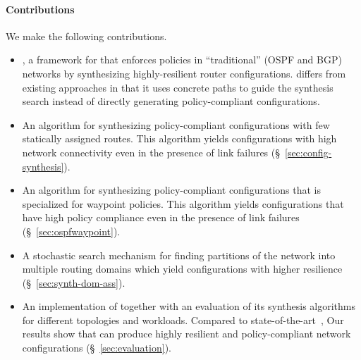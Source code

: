 \paragraph{Contributions} We make the following contributions.
\begin{itemize}	
    \item \name, a framework for
	that enforces policies in ``traditional'' (OSPF and BGP) networks
	by synthesizing highly-resilient router configurations. 		
	\name differs from existing approaches in that it uses concrete
	paths to guide the synthesis search instead of directly generating policy-compliant
	configurations.

	\item An algorithm for synthesizing policy-compliant
          configurations with few statically assigned routes. This
          algorithm yields configurations with high network
          connectivity even in the presence of link failures
          (\S~\ref{sec:config-synthesis}).

	\item An algorithm for synthesizing policy-compliant 		
		 configurations that is specialized for waypoint policies. 
		 This algorithm yields configurations that have
		 high policy compliance even in the presence of link failures (\S~\ref{sec:ospfwaypoint}). 
	
	\item A stochastic search mechanism for finding 
		partitions of the network into multiple routing domains which
		yield configurations with higher resilience (\S~\ref{sec:synth-dom-ass}).
	
	\item An implementation of \name together with an evaluation
          of its synthesis algorithms for different topologies and
          workloads. Compared to state-of-the-art~\cite{vechev},
            Our results show that \name
          can produce highly resilient and policy-compliant network
          configurations (\S~\ref{sec:evaluation}).
\end{itemize}
